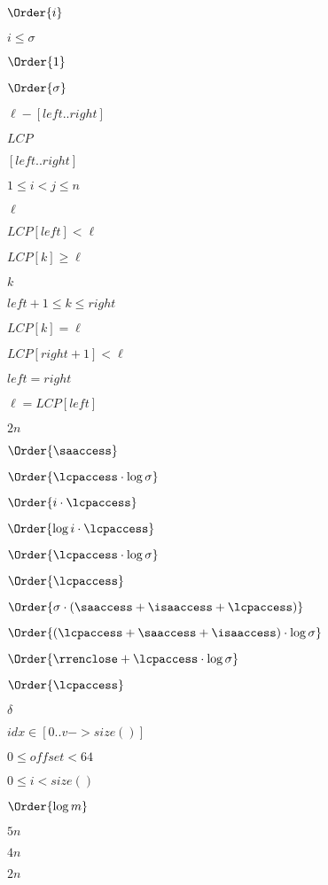 \documentclass{article}
\begin{document}
$ \Order{i} $
\pagebreak

$ i \leq \sigma $
\pagebreak

$ \Order{ 1 } $
\pagebreak

$ \Order{\sigma} $
\pagebreak

$\ell-[left..right]$
\pagebreak

$LCP$
\pagebreak

$[left..right]$
\pagebreak

$1\leq i<j\leq n$
\pagebreak

$\ell$
\pagebreak

$LCP[left]<\ell$
\pagebreak

$LCP[k]\geq \ell$
\pagebreak

$k$
\pagebreak

$left+1\leq k \leq right$
\pagebreak

$LCP[k] = \ell$
\pagebreak

$LCP[right+1]<\ell$
\pagebreak

$left=right$
\pagebreak

$\ell=LCP[left]$
\pagebreak

$2n$
\pagebreak

$ \Order{\saaccess} $
\pagebreak

$ \Order{\lcpaccess \cdot \log\sigma}$
\pagebreak

$ \Order{i \cdot \lcpaccess}$
\pagebreak

$\Order{\log i \cdot \lcpaccess}$
\pagebreak

$ \Order{\lcpaccess \cdot \log\sigma} $
\pagebreak

$ \Order{\lcpaccess} $
\pagebreak

$ \Order{ \sigma \cdot (\saaccess+\isaaccess+\lcpaccess) } $
\pagebreak

$ \Order{(\lcpaccess+\saaccess+\isaaccess) \cdot \log\sigma} $
\pagebreak

$ \Order{ \rrenclose + \lcpaccess \cdot \log\sigma} $
\pagebreak

$ \Order{\lcpaccess}$
\pagebreak

$\delta$
\pagebreak

$idx\in [0..v->size()]$
\pagebreak

$0\leq offset< 64$
\pagebreak

$ 0 \leq i < size() $
\pagebreak

$ \Order{\log m} $
\pagebreak

$ 5n $
\pagebreak

$ 4n $
\pagebreak

$ 2n $
\pagebreak
\end{document}
